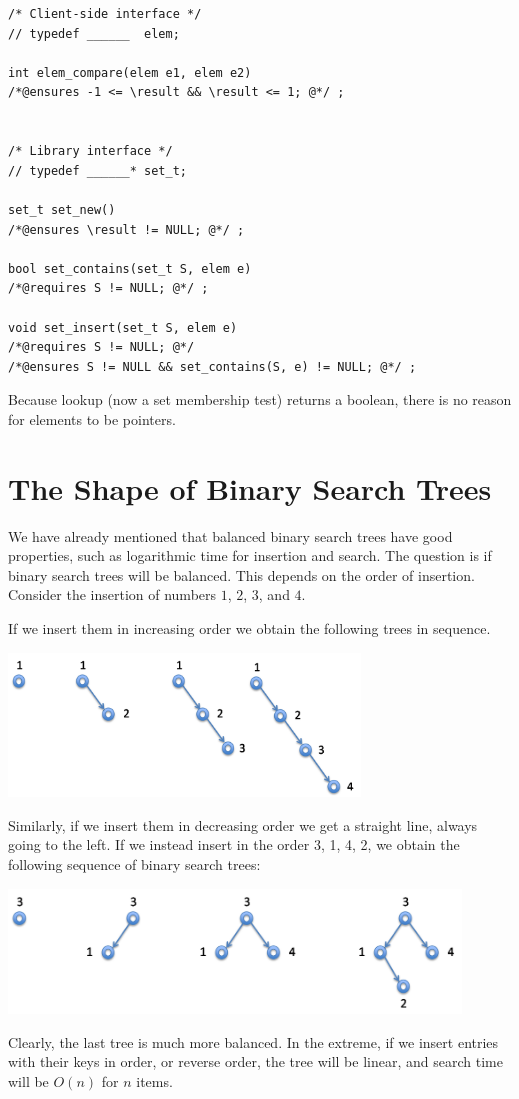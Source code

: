 \begin{lstlisting}[language={[C0]C}]
/* Client-side interface */
// typedef ______  elem;

int elem_compare(elem e1, elem e2)
/*@ensures -1 <= \result && \result <= 1; @*/ ;


/* Library interface */
// typedef ______* set_t;

set_t set_new()
/*@ensures \result != NULL; @*/ ;

bool set_contains(set_t S, elem e)
/*@requires S != NULL; @*/ ;

void set_insert(set_t S, elem e)
/*@requires S != NULL; @*/
/*@ensures S != NULL && set_contains(S, e) != NULL; @*/ ;
\end{lstlisting}

Because lookup (now a set membership test) returns a boolean, there is
no reason for elements to be pointers.


\section{The Shape of Binary Search Trees}
\label{sec:bst:shape}

We have already mentioned that balanced binary search trees have good
properties, such as logarithmic time for insertion and search.
The question is if binary search trees will be balanced.  This
depends on the order of insertion.  Consider the insertion of
numbers $1$, $2$, $3$, and $4$.

If we insert them in increasing order we obtain the following trees
in sequence.
\begin{center}
  \includegraphics[width=0.7\textwidth]{img/bst2.png}
\end{center}
Similarly, if we insert them in decreasing order we get a straight
line, always going to the left.  If we instead insert in
the order 3, 1, 4, 2, we obtain the following sequence of binary
search trees:
\begin{center}
  \includegraphics[width=0.9\textwidth]{img/bst3.png}
\end{center}
Clearly, the last tree is much more balanced.  In the extreme, if
we insert entries with their keys in order, or reverse order, the
tree will be linear, and search time will be $O(n)$
for $n$ items.

